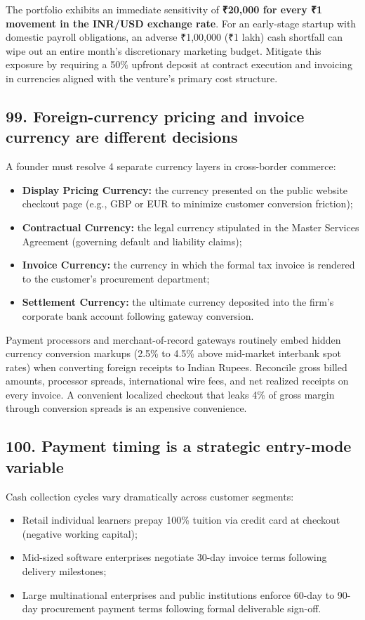 The portfolio exhibits an immediate sensitivity of \textbf{₹20,000 for every ₹1 movement in the INR/USD exchange rate}. For an early-stage startup with domestic payroll obligations, an adverse ₹1,00,000 (₹1 lakh) cash shortfall can wipe out an entire month's discretionary marketing budget. Mitigate this exposure by requiring a 50\% upfront deposit at contract execution and invoicing in currencies aligned with the venture's primary cost structure.

\subsection{99. Foreign-currency pricing and invoice currency are different decisions}

A founder must resolve 4 separate currency layers in cross-border commerce:
\begin{itemize}
    \item \textbf{Display Pricing Currency:} the currency presented on the public website checkout page (e.g., GBP or EUR to minimize customer conversion friction);
    \item \textbf{Contractual Currency:} the legal currency stipulated in the Master Services Agreement (governing default and liability claims);
    \item \textbf{Invoice Currency:} the currency in which the formal tax invoice is rendered to the customer's procurement department;
    \item \textbf{Settlement Currency:} the ultimate currency deposited into the firm's corporate bank account following gateway conversion.
\end{itemize}

Payment processors and merchant-of-record gateways routinely embed hidden currency conversion markups (2.5\% to 4.5\% above mid-market interbank spot rates) when converting foreign receipts to Indian Rupees. Reconcile gross billed amounts, processor spreads, international wire fees, and net realized receipts on every invoice. A convenient localized checkout that leaks 4\% of gross margin through conversion spreads is an expensive convenience.

\subsection{100. Payment timing is a strategic entry-mode variable}

Cash collection cycles vary dramatically across customer segments:
\begin{itemize}
    \item Retail individual learners prepay 100\% tuition via credit card at checkout (negative working capital);
    \item Mid-sized software enterprises negotiate 30-day invoice terms following delivery milestones;
    \item Large multinational enterprises and public institutions enforce 60-day to 90-day procurement payment terms following formal deliverable sign-off.
\end{itemize}

